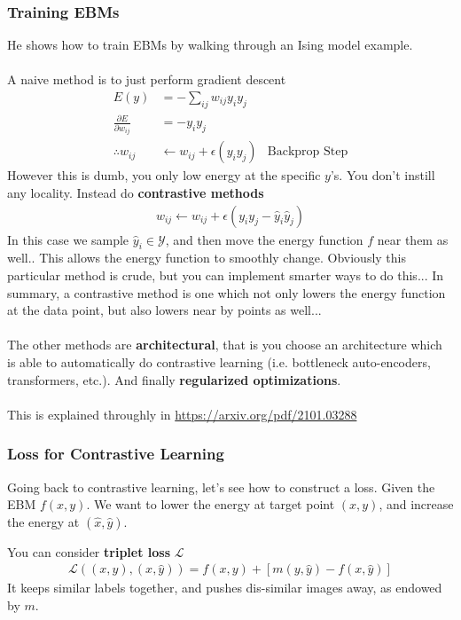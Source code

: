 \subsubsection{Training EBMs}
He shows how to train EBMs by walking through an Ising model example.\\
\\
A naive method is to just perform gradient descent
\begin{align}
	E(y) & = - \sum_{ij} w_{ij} y_i y_j\\
	\frac{\partial E}{\partial w_{ij}} & = - y_i y_j\\
	\therefore w_{ij} & \leftarrow w_{ij} + \epsilon (y_i y_j) & \text{Backprop Step}
\end{align}
However this is dumb, you only low energy at the specific $y$'s. You don't instill any locality. Instead do \textbf{contrastive methods}
\begin{align}
	w_{ij} \leftarrow w_{ij} + \epsilon (y_i y_j - \hat y_i \hat y_j)
\end{align}
In this case we sample $\hat y_i \in \mathcal Y$, and then move the energy function $f$ near them as well.. This allows the energy function to smoothly change. Obviously this particular method is crude, but you can implement smarter ways to do this... In summary, a contrastive method is one which not only lowers the energy function at the data point, but also lowers near by points as well...
\\
\\
The other methods are \textbf{architectural}, that is you choose an architecture which is able to automatically do contrastive learning (i.e. bottleneck auto-encoders, transformers, etc.). And finally \textbf{regularized optimizations}.
\\
\\
This is explained throughly in \url{https://arxiv.org/pdf/2101.03288}

\subsubsection{Loss for Contrastive Learning}
Going back to contrastive learning, let's see how to construct a loss. Given the EBM $f(x,y)$. We want to lower the energy at target point $(x,y)$, and increase the energy at $(\hat x, \hat y)$. 

You can consider \textbf{triplet loss} $\mathcal L$
\begin{align}
	\mathcal L((x,y), ( x, \hat y)) = f(x,y)  + [m(y, \hat  y) - f( x, \hat y)]
\end{align}
It keeps similar labels together, and pushes dis-similar images away, as endowed by $m$.

